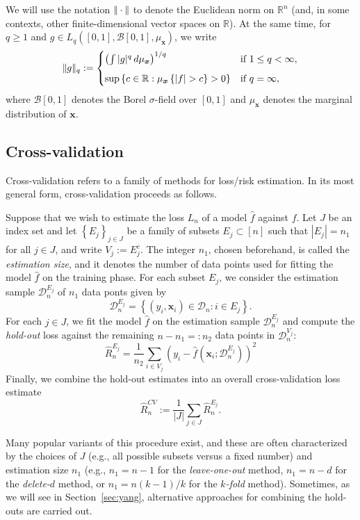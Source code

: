 \documentclass[11pt, letter paper]{article}
\newcommand{\1}{\mathmybb{1}}
\newcommand{\R}{\mathbb{R}}
\newcommand{\0}{\emptyset}
\newcommand{\paren}[1]{\left(#1 \right)}
\newcommand{\set}[1]{\left\{ #1 \right\}}
\newcommand{\norm}[1]{|\hspace{-1pt}|#1 |\hspace{-1pt}|}
\newcommand{\data}{\mathcal{D}_{n}}
\newcommand{\x}{\boldsymbol{x}}
\begin{document}
We will use the notation \(\norm{\cdot}\) to denote the Euclidean norm on \(\R^{n}\) (and, in some contexts, other finite-dimensional vector spaces on \(\R\)). At the same time, for \(q\geq 1\) and \(g\in L_{q}([0,1], \mathcal{B}[0,1], \mu_{\x})\), we write 
\[\norm{g}_{q} := \begin{cases}
    \paren{\int|g|^{q}\,d\mu_{\x}}^{1/q}&\text{if }1\leq q < \infty,\\[2mm]
    \sup\set{c\in\R:\mu_{\x}\set{|f|>c}>0} &\text{if } q = \infty,
\end{cases}\]
where \(\mathcal{B}[0,1]\) denotes the Borel \(\sigma\)-field over \([0,1]\) and \(\mu_{\x}\) denotes the marginal distribution of \(\x\).


\subsection{Cross-validation}\label{sec:cv}

Cross-validation refers to a family of methods for loss/risk estimation. In its most general form, cross-validation proceeds as follows. 

Suppose that we wish to estimate the loss \(L_{n}\) of a model \(\hat{f}\) against \(f\). Let \(J\) be an index set and let \(\set{E_{j}}_{j\in J}\) be a family of subsets \(E_{j}\subset [n]\) such that \(|E_{j}|=n_{1}\) for all \(j\in J\), and write \(V_{j} := E_{j}^{c}\). The integer \(n_{1}\), chosen beforehand, is called the \emph{estimation size}, and it denotes the number of data points used for fitting the model \(\hat{f}\) on the training phase. For each subset \(E_{j}\), we consider the estimation sample \(\data^{E_{j}}\) of \(n_{1}\) data ponts given by
\[\data^{E_{j}} = \set{\paren{y_{i}, \x_{i}}\in\data :i\in E_{j}}.\]
For each \(j\in J\), we fit the model \(\hat{f}\) on the estimation sample \(\data^{E_{j}}\) and compute the \emph{hold-out} loss against the remaining \(n-n_{1}=: n_{2}\) data points in \(\data^{V_{j}}\):
\[\hat{R}_{n}^{E_{j}} = \frac{1}{n_{2}}\sum_{i \in V_{j}} \paren{y_{i} - \hat{f}\paren{\x_{i};\data^{E_{j}}}}^{2}\]
Finally, we combine the hold-out estimates into an overall cross-validation loss estimate
\[\hat{R}^{CV}_{n}:= \frac{1}{|J|}\sum_{j\in J}\hat{R}_{n}^{E_{j}}.\]

Many popular variants of this procedure exist, and these are often characterized by the choices of \(J\) (e.g., all possible subsets versus a fixed number) and estimation size \(n_{1}\) (e.g., \(n_{1}=n-1\) for the \emph{leave-one-out} method, \(n_{1}=n-d\) for the \emph{delete-\(d\)} method, or \(n_{1} = n(k-1)/k\) for the \emph{\(k\)-fold} method). Sometimes, as we will see in Section~\ref{sec:yang}, alternative approaches for combining the hold-outs are carried out.
\end{document}
